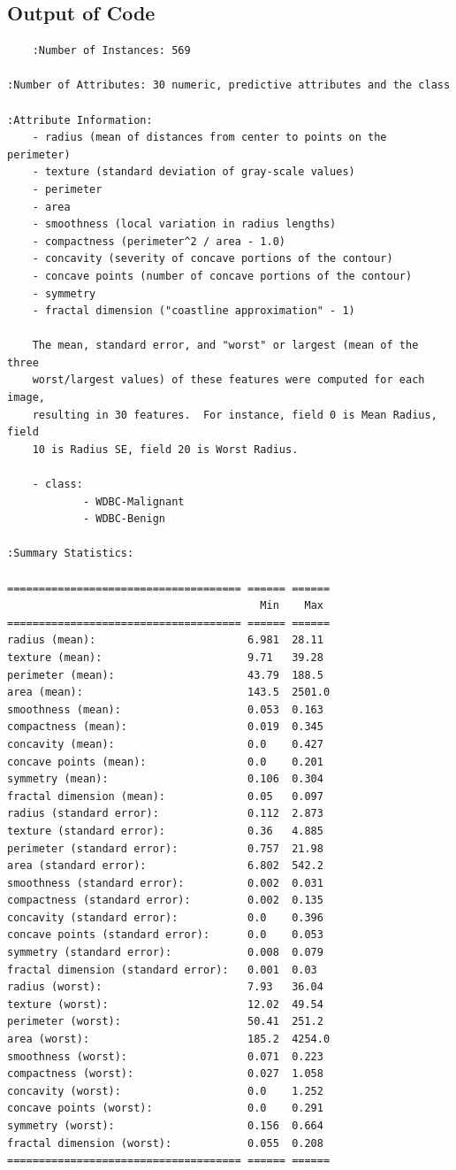 \documentclass[a4paper,12pt]{article}
\begin{document}
\subsection{Output of Code}

\begin{verbatim}
    :Number of Instances: 569

:Number of Attributes: 30 numeric, predictive attributes and the class

:Attribute Information:
    - radius (mean of distances from center to points on the perimeter)
    - texture (standard deviation of gray-scale values)
    - perimeter
    - area
    - smoothness (local variation in radius lengths)
    - compactness (perimeter^2 / area - 1.0)
    - concavity (severity of concave portions of the contour)
    - concave points (number of concave portions of the contour)
    - symmetry
    - fractal dimension ("coastline approximation" - 1)

    The mean, standard error, and "worst" or largest (mean of the three
    worst/largest values) of these features were computed for each image,
    resulting in 30 features.  For instance, field 0 is Mean Radius, field
    10 is Radius SE, field 20 is Worst Radius.

    - class:
            - WDBC-Malignant
            - WDBC-Benign

:Summary Statistics:

===================================== ====== ======
                                        Min    Max
===================================== ====== ======
radius (mean):                        6.981  28.11
texture (mean):                       9.71   39.28
perimeter (mean):                     43.79  188.5
area (mean):                          143.5  2501.0
smoothness (mean):                    0.053  0.163
compactness (mean):                   0.019  0.345
concavity (mean):                     0.0    0.427
concave points (mean):                0.0    0.201
symmetry (mean):                      0.106  0.304
fractal dimension (mean):             0.05   0.097
radius (standard error):              0.112  2.873
texture (standard error):             0.36   4.885
perimeter (standard error):           0.757  21.98
area (standard error):                6.802  542.2
smoothness (standard error):          0.002  0.031
compactness (standard error):         0.002  0.135
concavity (standard error):           0.0    0.396
concave points (standard error):      0.0    0.053
symmetry (standard error):            0.008  0.079
fractal dimension (standard error):   0.001  0.03
radius (worst):                       7.93   36.04
texture (worst):                      12.02  49.54
perimeter (worst):                    50.41  251.2
area (worst):                         185.2  4254.0
smoothness (worst):                   0.071  0.223
compactness (worst):                  0.027  1.058
concavity (worst):                    0.0    1.252
concave points (worst):               0.0    0.291
symmetry (worst):                     0.156  0.664
fractal dimension (worst):            0.055  0.208
===================================== ====== ======


\end{verbatim}
\end{document}
